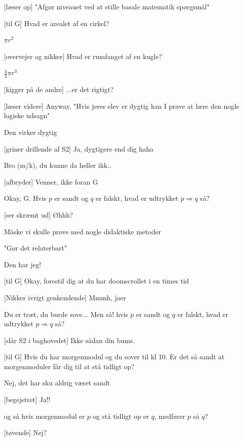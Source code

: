 \documentclass[a4paper,11pt]{article}
\begin{document}
\begin{sketch}
[læser op] "Afgør niveauet ved at stille basale matematik spørgsmål"

[til G] Hvad er arealet af en cirkel?

 $\pi r^2$

[overvejer og nikker] Hvad er rumfanget af en kugle?

 $\tfrac{4}{3}\pi r^3$

[kigger på de andre] ...er det rigtigt?


[læser videre] Anyway,  "Hvis jeres elev er dygtig kan I prøve at lære den nogle logiske udsagn"

 Den virker dygtig

[griner drillende af S2] Ja, dygtigere end dig haha

 Bro (m/k), du kunne da heller ikk..

[afbryder] Venner, ikke foran G

 Okay, G. Hvis $p$ er sandt og $q$ er falskt, hvad er udtrykket $p \Rightarrow q$ så?

[ser skræmt ud] Øhhh?

 Måske vi skulle prøve med nogle didaktiske metoder


 "Gør det relaterbart"

 Den har jeg!

[til G] Okay, forestil dig at du har doomscrollet i en times tid

[Nikker ivrigt genkendende] Mmmh, jaer

 Du er træt, du burde sove... Men så! hvis $p$ er sandt og $q$ er falskt, hvad er udtrykket $p \Rightarrow q$ så?

[slår S2 i baghovedet] Ikke sådan din bums. 

[til G] Hvis du har morgenmodul og du sover til kl 10. Er det så sandt at morgenmoduler får dig til at stå tidligt op?

 Nej, det har sku aldrig været sandt

[begejstret] Ja!!

 og så hvis morgenmodul er $p$ og stå tidligt op er $q$, medfører $p$ så $q$?

[tøvende] Nej?


\end{sketch}
\end{document}
